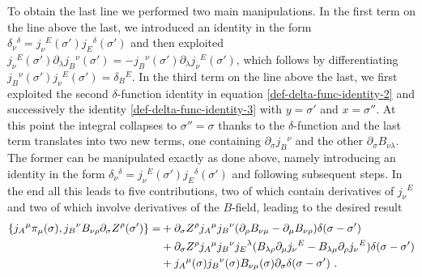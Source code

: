 \documentclass[12pt]{article}
\numberwithin{equation}{section}
\begin{document}
To obtain the last line we performed two main manipulations. In the first term on the line above the last, we introduced an identity in the form $\delta_{\nu}{}^{\delta}=j_{\nu}{}^{E}(\sigma')j_{E}{}^{\delta}(\sigma')$ and then exploited $j_{\nu}{}^{E}(\sigma')\partial_{\lambda}j_{B}{}^{\nu}(\sigma')=-j_{B}{}^{\nu}(\sigma')\partial_{\lambda}j_{\nu}{}^{E}(\sigma')$, which follows by differentiating $j_{B}{}^{\nu}(\sigma')j_{\nu}{}^{E}(\sigma')=\delta_{B}{}^{E}$. In the third term on the line above the last, we first exploited the second $\delta$-function identity in equation \eqref{def-delta-func-identity-2} and successively the identity \eqref{def-delta-func-identity-3} with $y=\sigma'$ and $x=\sigma''$. At this point the integral collapses to $\sigma''=\sigma$ thanks to the $\delta$-function and the last term translates into two new terms, one containing $\partial_{\sigma}j_{B}{}^{\nu}$ and the other $\partial_{\sigma}B_{\nu\lambda}$. The former can be manipulated exactly as done above, namely introducing an identity in the form $\delta_{\nu}{}^{\delta}=j_{\nu}{}^{E}(\sigma')j_{E}{}^{\delta}(\sigma')$ and following subsequent steps. In the end all this leads to five contributions, two of which contain derivatives of $j_{\nu}{}^{E}$ and two of which involve derivatives of the $B$-field, leading to the desired result
\begin{align}\label{B-field-brackets-intermediate}
\{ j_{A}{}^{\mu}\pi_{\mu}(\sigma),j_{B}{}^{\nu}B_{\nu\rho}\partial_{\sigma}Z^{\rho}(\sigma') \} =&+ \partial_{\sigma}Z^{\rho} j_{A}{}^{\mu}j_{B}{}^{\nu}(\partial_{\rho}B_{\nu\mu}-\partial_{\mu}B_{\nu\rho})\delta(\sigma-\sigma') 
\notag \\
&+\partial_{\sigma}Z^{\rho} j_{A}{}^{\mu}j_{B}{}^{\nu}j_{E}{}^{\lambda}(B_{\lambda\rho}\partial_{\mu}j_{\nu}{}^{E}-B_{\lambda\mu}\partial_{\rho}j_{\nu}{}^{E})\delta(\sigma-\sigma') 
\notag \\
&+ j_{A}{}^{\mu}(\sigma)j_{B}{}^{\nu}(\sigma)B_{\nu\mu}(\sigma)\partial_{\sigma}\delta(\sigma-\sigma')\,\, .
\end{align}
\end{document}

